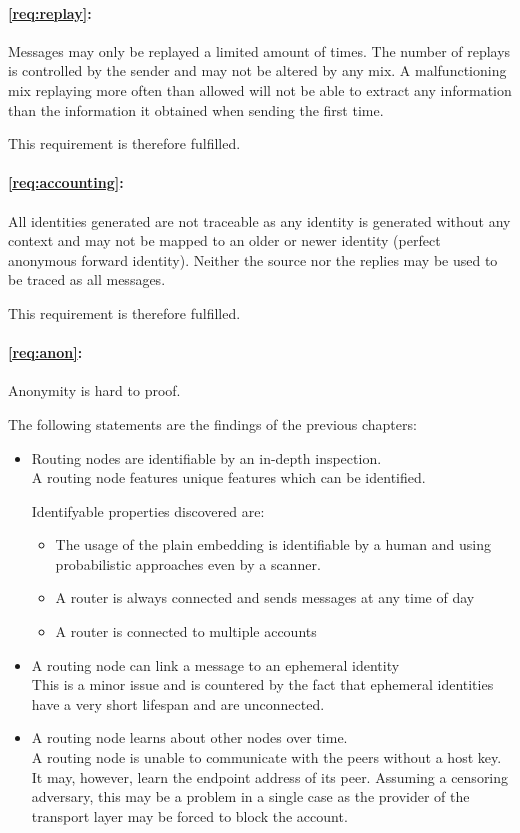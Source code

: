\paragraph*{\ref{req:replay}:} Messages may only be replayed a limited amount of times. The number of replays is controlled by the sender and may not be altered by any mix. A malfunctioning mix replaying more often than allowed will not be able to extract any information than the information it obtained when sending the first time. 

This requirement is therefore fulfilled.

\paragraph*{\ref{req:accounting}:} 
All identities generated are not traceable as any identity is generated without any context and may not be mapped to an older or newer identity (perfect anonymous forward identity). Neither the source nor the replies may be used to be traced as all messages. 

This requirement is therefore fulfilled.

\paragraph*{\ref{req:anon}:} Anonymity is hard to proof. 

The following statements are the findings of the previous chapters:
\begin{itemize}
	\item Routing nodes are identifiable by an in-depth inspection.\\
	A routing node features unique features which can be identified. 
	
	Identifyable properties discovered are:
	\begin{itemize}
		\item The usage of the plain embedding is identifiable by a human and using probabilistic approaches even by a scanner.
		\item A router is always connected and sends messages at any time of day
		\item A router is connected to multiple accounts
	\end{itemize}
	\item A routing node can link a message to an ephemeral identity\\
	This is a minor issue and is countered by the fact that ephemeral identities have a very short lifespan and are unconnected.
	\item A routing node learns about other nodes over time.\\
	A routing node is unable to communicate with the peers without a host key. It may, however, learn the endpoint address of its peer. Assuming a censoring adversary, this may be a problem in a single case as the provider of the transport layer may be forced to block the account.
\end{itemize}

